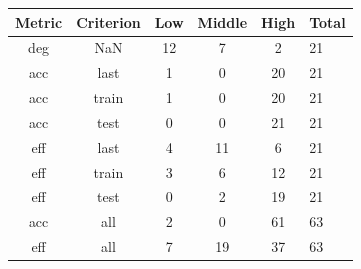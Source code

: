 \begin{tabular}{|c|c|c|c|c|}
\toprule
Metric & Criterion & Low & Middle & High & Total \\
\midrule
deg & NaN & 12 & 7 & 2 & 21 \\
acc & last & 1 & 0 & 20 & 21 \\
acc & train & 1 & 0 & 20 & 21 \\
acc & test & 0 & 0 & 21 & 21 \\
eff & last & 4 & 11 & 6 & 21 \\
eff & train & 3 & 6 & 12 & 21 \\
eff & test & 0 & 2 & 19 & 21 \\
acc & all & 2 & 0 & 61 & 63 \\
eff & all & 7 & 19 & 37 & 63 \\
\bottomrule
\end{tabular}
